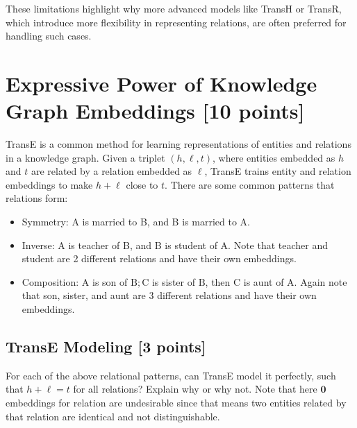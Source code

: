 \documentclass[11pt]{article}
\numberwithin{figure}{section}
\begin{document}
These limitations highlight why more advanced models like TransH or TransR, which introduce more flexibility in representing relations, are often preferred for handling such cases.

\newpage

\section{Expressive Power of Knowledge Graph Embeddings [10 points]}
TransE is a common method for learning representations of entities and relations in a knowledge graph. Given a triplet $(h, \ell, t)$, where entities embedded as $h$ and $t$ are related by a relation embedded as $\ell$, TransE trains entity and relation embeddings to make $h+\ell$ close to $t$. There are some common patterns that relations form:
\begin{itemize}
    \item Symmetry: A is married to B, and B is married to A.
    \item Inverse: A is teacher of B, and B is student of A. Note that teacher and student are 2 different relations and have their own embeddings.
    \item Composition: $\mathrm{A}$ is son of $\mathrm{B} ; \mathrm{C}$ is sister of $\mathrm{B}$, then $\mathrm{C}$ is aunt of $\mathrm{A}$. Again note that son, sister, and aunt are 3 different relations and have their own embeddings.
\end{itemize}
\subsection{TransE Modeling [3 points]}
For each of the above relational patterns, can TransE model it perfectly, such that $h+\ell=t$ for all relations? Explain why or why not. Note that here $\mathbf{0}$ embeddings for relation are undesirable since that means two entities related by that relation are identical and not distinguishable.
\end{document}
